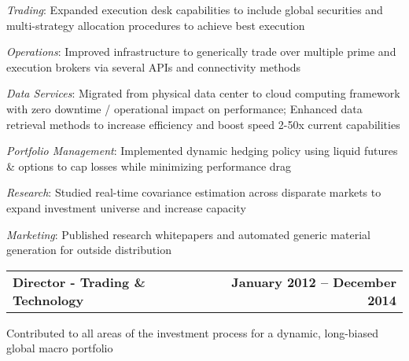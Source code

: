 \documentclass[10.75pt]{article}
\begin{document}
    \begin{list}{}{\leftmargin=1em}
      \item \textit{Trading}: Expanded execution desk capabilities to include
        global securities and multi-strategy allocation procedures to achieve
        best execution
      \item \textit{Operations}: Improved infrastructure to generically trade over
        multiple prime and execution brokers via several APIs and connectivity methods
      \item \textit{Data Services}: Migrated from physical data center to cloud
        computing framework with zero downtime / operational impact on performance;
        Enhanced data retrieval methods to increase efficiency and boost speed
        2-50x current capabilities
      \item \textit{Portfolio Management}: Implemented dynamic hedging policy using
        liquid futures \& options to cap losses while minimizing performance drag
      \item \textit{Research}: Studied real-time covariance estimation across
        disparate markets to expand investment universe and increase capacity
      \item \textit{Marketing}: Published research whitepapers and automated
        generic material generation for outside distribution 
    \end{list}
  \begin{tabular*}{7.5in}{@{\extracolsep{\fill}}lr}
    \textbf{Director - Trading \& Technology} & \textbf{January 2012 -- December 2014}
  \end{tabular*}
    \begin{list}{}{\leftmargin=0em}
      \item Contributed to all areas of the investment process for a dynamic, long-biased
        global macro portfolio
    \end{list}
\end{document}
